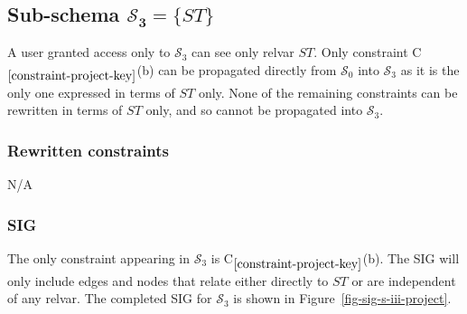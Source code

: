 \documentclass{article}
\newcounter{constraint}
\newcommand{\identifier}[1]{\ensuremath{\mathit{#1}}}
\newcommand{\ST}{\identifier{ST}}
\newcommand{\schema}[1]{\ensuremath{\mathcal{S}_{#1}}}
\newcommand{\Constraint}[2][]{C\ensuremath{_{#2}\ifx&#1&\else^{#1}\fi}}
\begin{document}




\subsection{Sub-schema \(\bm{\schema{3} = \{\ST\}}\)}

\noindent A user granted access only to \(\schema{3}\) can see only relvar \(\ST\). Only constraint \Constraint{\ref{constraint-project-key}}(b) can be propagated directly from \(\schema{0}\) into \(\schema{3}\) as it is the only one expressed in terms of \(\ST\) only. None of the remaining constraints can be rewritten in terms of \(\ST\) only, and so cannot be propagated into \(\schema{3}\).




\subsubsection{Rewritten constraints}
\label{sec-constraints-s-iii-project}

N/A




\subsubsection{SIG}
\label{sec-sigs-s-iii-project}

\noindent The only constraint appearing in \(\schema{3}\) is \Constraint{\ref{constraint-project-key}}(b). The SIG will only include edges and nodes that relate either directly to \(\ST\) or are independent of any relvar. The completed SIG for \(\schema{3}\) is shown in Figure~\ref{fig-sig-s-iii-project}.

\end{document}
